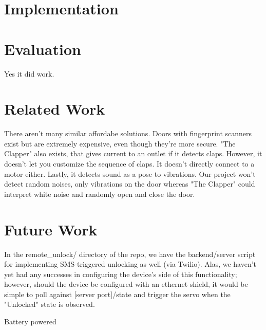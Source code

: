 \documentclass[11pt]{article}			%
\begin{document}
\section{Implementation}

\section{Evaluation}
Yes it did work. 

\section{Related Work}
There aren't many similar affordabe solutions. Doors with fingerprint scanners exist but are extremely expensive, even though they're more secure. "The Clapper" also exists, that gives current to an outlet if it detects claps. However, it doesn't let you customize the sequence of claps. It doesn't directly connect to a motor either. Lastly, it detects sound as a pose to vibrations. Our project won't detect random noises, only vibrations on the door whereas "The Clapper" could interpret white noise and randomly open and close the door.

\section{Future Work}

In the remote\_unlock/ directory of the repo, we have the backend/server script for implementing SMS-triggered unlocking as well (via Twilio). Alas, we haven't yet had any successes in configuring the device's side of this functionality; however, should the device be configured with an ethernet shield, it would be simple to poll against [server port]/state and trigger the servo when the "Unlocked" state is observed.

Battery powered
\end{document}
